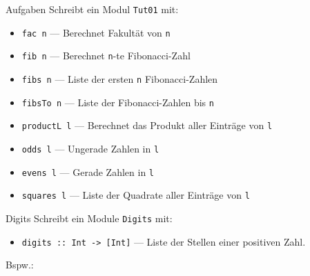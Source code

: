 \documentclass{beamer}
\begin{document}
\begin{frame}{Aufgaben}
	Schreibt ein Modul \texttt{Tut01} mit:

	\begin{itemize}
		\item \texttt{fac n} --- Berechnet Fakultät von \texttt{n}
		\item \texttt{fib n} --- Berechnet \texttt{n}-te Fibonacci-Zahl
		\item \texttt{fibs n} --- Liste der ersten \texttt{n} Fibonacci-Zahlen
		\item \texttt{fibsTo n} --- Liste der Fibonacci-Zahlen bis \texttt{n}
		\item \texttt{productL l} --- Berechnet das Produkt aller Einträge von \texttt{l}
                \item \texttt{odds l} --- Ungerade Zahlen in \texttt{l}
                \item \texttt{evens l} --- Gerade Zahlen in \texttt{l}
		\item \texttt{squares l} --- Liste der Quadrate aller Einträge von \texttt{l}
	\end{itemize}
\end{frame}

\begin{frame}{Digits}
  Schreibt ein Module \texttt{Digits} mit:

  \begin{itemize}
    \item \texttt{digits :: Int -> [Int]} --- Liste der Stellen einer positiven Zahl.
  \end{itemize}

  Bspw.:

\end{frame}
\end{document}
